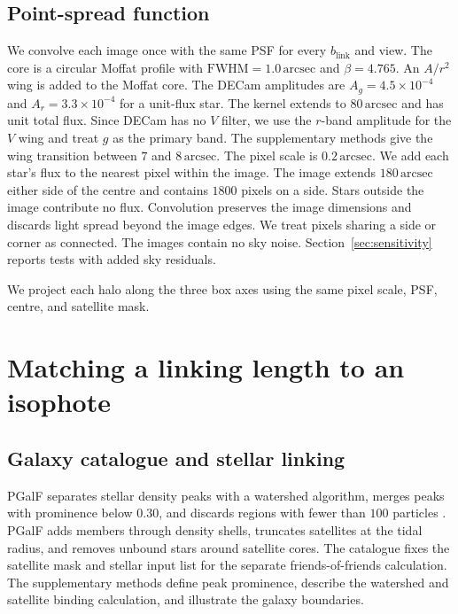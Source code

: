 \documentclass[usenatbib]{mnras}
\begin{document}
\subsection{Point-spread function}
\label{sec:psf}

We convolve each image once with the same PSF for every $b_{\mathrm{link}}$ and view.
The core is a circular Moffat profile with
$\mathrm{FWHM}=1.0\,\mathrm{arcsec}$ and $\beta=4.765$.
An $A/r^{2}$ wing is added to the Moffat core.
The DECam amplitudes are $A_{g}=4.5\times10^{-4}$ and
$A_{r}=3.3\times10^{-4}$ for a unit-flux star.
The kernel extends to $80\,\mathrm{arcsec}$ and has unit total flux.
Since DECam has no $V$ filter, we use the $r$-band amplitude for the
$V$ wing and treat $g$ as the primary band.
The supplementary methods give the wing transition between $7$ and
$8\,\mathrm{arcsec}$.
The pixel scale is $0.2\,\mathrm{arcsec}$.
We add each star's flux to the nearest pixel within the image.
The image extends $180\,\mathrm{arcsec}$ either side of the centre and
contains $1800$ pixels on a side.
Stars outside the image contribute no flux. Convolution preserves the
image dimensions and discards light spread beyond the image edges.
We treat pixels sharing a side or corner as connected.
The images contain no sky noise.
Section~\ref{sec:sensitivity} reports tests with added sky residuals.

\label{sec:axes}

We project each halo along the three box axes using the same pixel
scale, PSF, centre, and satellite mask.

\section{Matching a linking length to an isophote}
\label{sec:match}

\subsection{Galaxy catalogue and stellar linking}
\label{sec:finder}

PGalF separates stellar density peaks with a watershed algorithm,
merges peaks with prominence below $0.30$, and discards regions with
fewer than $100$ particles \citep{kim2023}.
PGalF adds members through density shells, truncates satellites at the
tidal radius, and removes unbound stars around satellite cores.
The catalogue fixes the satellite mask and stellar input list for the
separate friends-of-friends calculation.
The supplementary methods define peak prominence, describe the
watershed and satellite binding calculation, and illustrate the
galaxy boundaries.
\end{document}
